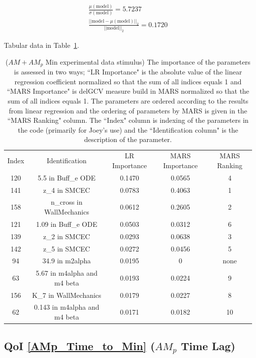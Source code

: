 \documentclass[12pt]{article}
\numberwithin{equation}{section}
\begin{document}
\begin{eqnarray*}
\frac{\mu(\text{model})}{\sigma(\text{model})} = 5.7237\\
\frac{\vert \vert \text{model}-\mu(\text{model}) \vert \vert_2 }{\vert \vert \text{model}\vert \vert_2 } = 0.1720
\end{eqnarray*}

Tabular data in Table~\ref{qoi_AM_AMp_Min_ex}.
 
\begin{table}[h]
\centering
\begin{tabular}{ccccc}
Index & Identification & LR Importance & MARS Importance & MARS Ranking \\
120 & 5.5 in Buff\_e ODE & 0.1470 & 0.0565 & 4\\
141 & z\_4 in SMCEC & 0.0783 & 0.4063 & 1\\
158 & n\_cross in WallMechanics & 0.0612 & 0.2605 & 2\\
121 & 1.09 in Buff\_e ODE & 0.0503 & 0.0312 & 6\\
139 & z\_2 in SMCEC & 0.0293 & 0.0638 & 3\\ 
142 & z\_5 in SMCEC & 0.0272 & 0.0456 & 5\\ 
94 & 34.9 in m2alpha & 0.0195 & 0 & none \\
63 &   5.67 in m4alpha and m4 beta &  0.0193 &  0.0224 & 9\\
156 & K\_7 in WallMechanics & 0.0179 & 0.0227 & 8\\
62 & 0.143 in m4alpha and m4 beta & 0.0171 & 0.0182 & 10\\
\end{tabular}
\caption{($AM+AM_p$ Min experimental data stimulus) The importance of the parameters is assessed in two ways; ``LR Importance" is the absolute value of the linear regression coefficient normalized so that the sum of all indices equals 1 and ``MARS Importance" is delGCV measure build in MARS normalized so that the sum of all indices equals 1. The parameters are ordered according to the results from linear regression and the ordering of parameters by MARS is given in the ``MARS Ranking" column. The ``Index" column is indexing of the parameters in the code (primarily for Joey's use) and the ``Identification column" is the description of the parameter.}
\label{qoi_AM_AMp_Min_ex}
\end{table}

\newpage
\subsection{QoI \eqref{AMp_Time_to_Min} ($AM_p$ Time Lag)}
\end{document}
